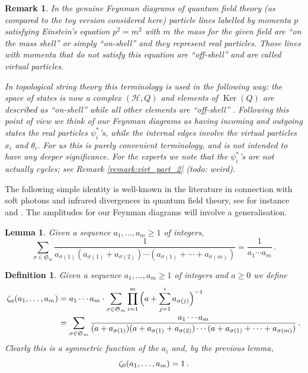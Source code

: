 \documentclass[english,letter paper,12pt,leqno]{article}
\newtheorem{lemma}[theorem]{Lemma}
\theoremstyle{example}
\newtheorem{definition}[theorem]{Definition}
\newtheorem{remark}[theorem]{Remark}
\numberwithin{equation}{section}
\def\Ker{\operatorname{Ker}}
\def\be{\begin{equation}}
\def\ee{\end{equation}}
\begin{document}
\begin{remark}\label{remark:virtual_part} In the genuine Feynman diagrams of quantum field theory (as compared to the toy version considered here) particle lines labelled by momenta $p$ satisfying Einstein's equation $p^2 = m^2$ with $m$ the mass for the given field are ``on the mass shell'' or simply ``on-shell'' and they represent real particles. Those lines with momenta that do not satisfy this equation are ``off-shell'' and are called \emph{virtual} particles.

In topological string theory this terminology is used in the following way: the space of states is now a complex $(\mathscr{H}, Q)$ and elements of $\Ker(Q)$ are described as ``on-shell'' while all other elements are ``off-shell'' \cite{sullivan, lazaroiu2}. Following this point of view we think of our Feynman diagrams as having incoming and outgoing states the real particles $\psi_i^*$'s, while the internal edges involve the virtual particles $x_i$ and $\theta_i$. For us this is purely convenient terminology, and is not intended to have any deeper significance. For the experts we note that the $\psi^*_i$'s are not actually cycles; see Remark \ref{remark:virt_part_2} (todo: weird).
\end{remark}

The following simple identity is well-known in the literature in connection with soft photons and infrared divergences in quantum field theory, see for instance \cite[Ch 13]{weinberg} and \cite[p.204]{ps}. The amplitudes for our Feynman diagrams will involve a generalisation.

\begin{lemma} Given a sequence $a_1,\ldots,a_m \ge 1$ of integers,
\be
\sum_{\sigma \in \mathfrak{S}_m} \frac{1}{a_{\sigma(1)}(a_{\sigma(1)} + a_{\sigma(2)}) \cdots (a_{\sigma(1)} + \cdots + a_{\sigma(m)})} = \frac{1}{a_1 \cdots a_m}\,.
\ee
\end{lemma}

\begin{definition}\label{defn:zeta} Given a sequence $a_1,\ldots,a_m \ge 1$ of integers and $a \ge 0$ we define
\begin{align*}
\zeta_a(a_1, \ldots, a_m) &= a_1 \cdots a_m \cdot \sum_{\sigma \in \mathfrak{S}_m} \prod_{i=1}^{m} \Big( a + \sum_{j=1}^i a_{\sigma(j)} \Big)^{-1} \\
&= \sum_{\sigma \in \mathfrak{S}_m} \frac{a_1 \cdots a_m}{(a + a_{\sigma(1)}) (a + a_{\sigma(1)} + a_{\sigma(2)}) \cdots (a + a_{\sigma(1)} + \cdots + a_{\sigma(m)})}\,.
\end{align*}
Clearly this is a symmetric function of the $a_i$ and, by the previous lemma,
\be\label{eq:sampzero}
\samp_0(a_1,\ldots,a_m) = 1\,.
\ee
\end{definition}
\end{document}
